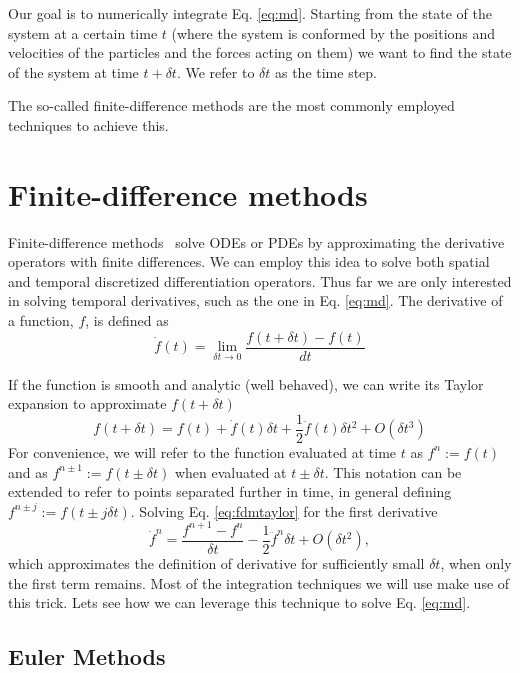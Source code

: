 \documentclass[ twoside,openright,titlepage,numbers=noenddot,%
headinclude,footinclude,cleardoublepage=empty,abstract=on,
BCOR=5mm,paper=b5,fontsize=11pt, dvipsnames
]{scrreprt}
\newcommand{\dt}{\delta t}
\newcommand{\half}{\frac{1}{2}}
\begin{document}
Our goal is to numerically integrate Eq. \eqref{eq:md}. Starting from the state of the system at a certain time $t$ (where the system is conformed by the positions and velocities of the particles and the forces acting on them) we want to find the state of the system at time $t + \dt$. We refer to $\dt$ as the time step.

The so-called finite-difference methods are the most commonly employed techniques to achieve this.
\section{Finite-difference methods}
Finite-difference methods~\cite{Grossmann2007} solve \glspl{ODE} or \glspl{PDE} by approximating the derivative operators with finite differences.
We can employ this idea to solve both spatial and temporal discretized differentiation operators. Thus far we are only interested in solving temporal derivatives, such as the one in Eq. \eqref{eq:md}.
The derivative of a function, $f$, is defined as
\begin{equation}
  \dot{f}(t) = \lim_{\dt\rightarrow 0} \frac{f(t+\dt) - f(t)}{dt}
\end{equation}

If the function is smooth and analytic (well behaved), we can write its Taylor expansion to approximate $f(t+\dt)$
\begin{equation}
  \label{eq:fdmtaylor}
  f(t+\dt) = f(t)+\dot{f}(t)\dt + \half\ddot{f}(t)\dt^2 + O(\dt^3)
\end{equation}
For convenience, we will refer to the function evaluated at time $t$ as $f^n := f(t)$ and as $f^{n\pm 1} := f(t\pm \dt)$ when evaluated at $t\pm \dt$. This notation can be extended to refer to points separated further in time, in general defining $f^{n\pm j} := f(t\pm j\dt)$.
Solving Eq. \eqref{eq:fdmtaylor} for the first derivative
\begin{equation}
 \dot{f}^n  =  \frac{f^{n+1} - f^n}{\dt} - \half\ddot{f}^n\dt + O(\dt^2),
\end{equation}
which approximates the definition of derivative for sufficiently small $\dt$, when only the first term remains.
Most of the integration techniques we will use make use of this trick.
Lets see how we can leverage this technique to solve Eq. \eqref{eq:md}.
\subsection{Euler Methods}\label{sec:euler}
\end{document}
